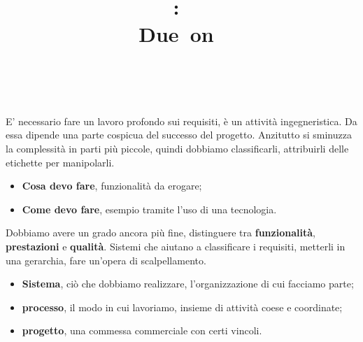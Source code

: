 \documentclass{article}
\title{
\vspace{2in}
\textmd{\textbf{\hmwkClass:\ \hmwkTitle}}\\
\normalsize\vspace{0.1in}\small{Due\ on\ \hmwkDueDate}\\
\vspace{0.1in}\large{\textit{\hmwkClassInstructor\ \hmwkClassTime}}
\vspace{3in}
}
\author{\textbf{\hmwkAuthorName}}
\date{} %
\begin{document}
\maketitle



\newpage
\newpage



E' necessario fare un lavoro profondo sui requisiti, è un attività ingegneristica. Da essa dipende una parte cospicua del successo del progetto. Anzitutto si sminuzza la complessità in parti più piccole, quindi dobbiamo classificarli, attribuirli delle etichette per manipolarli.

\begin{itemize}

	\item \textbf{Cosa devo fare}, funzionalità da erogare;
	\item \textbf{Come devo fare}, esempio tramite l'uso di una tecnologia.

\end{itemize}

Dobbiamo avere un grado ancora più fine, distinguere tra \textbf{funzionalità}, \textbf{prestazioni} e \textbf{qualità}. Sistemi che aiutano a classificare i requisiti, metterli in una gerarchia, fare un'opera di scalpellamento.

\begin{itemize}

	\item \textbf{Sistema}, ciò che dobbiamo realizzare, l'organizzazione di cui facciamo parte;
	\item \textbf{processo}, il modo in cui lavoriamo, insieme di attività coese e coordinate;
	\item \textbf{progetto}, una commessa commerciale con certi vincoli.

\end{itemize}
\end{document}

